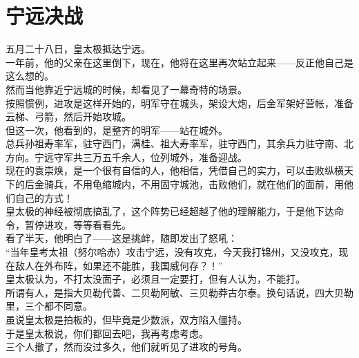 \section{宁远决战}
\ifnum{}
	\begin{multicols}{\theparacolNo}
\fi
五月二十八日，皇太极抵达宁远。\\

一年前，他的父亲在这里倒下，现在，他将在这里再次站立起来——反正他自己是这么想的。\\

然而当他靠近宁远城的时候，却看见了一幕奇特的场景。\\

按照惯例，进攻是这样开始的，明军守在城头，架设大炮，后金军架好营帐，准备云梯、弓箭，然后开始攻城。\\

但这一次，他看到的，是整齐的明军——站在城外。\\

总兵孙祖寿率军，驻守西门，满桂、祖大寿率军，驻守西门，其余兵力驻守南、北方向。宁远守军共三万五千余人，位列城外，准备迎战。\\

现在的袁崇焕，是一个很有自信的人，他相信，凭借自己的实力，可以击败纵横天下的后金骑兵，不用龟缩城内，不用固守城池，击败他们，就在他们的面前，用他们自己的方式！\\

皇太极的神经被彻底搞乱了，这个阵势已经超越了他的理解能力，于是他下达命令，暂停进攻，等等看看先。\\

看了半天，他明白了——这是挑衅，随即发出了怒吼：\\

“当年皇考太祖（努尔哈赤）攻击宁远，没有攻克，今天我打锦州，又没攻克，现在敌人在外布阵，如果还不能胜，我国威何存？！”\\

皇太极认为，不打太没面子，必须且一定要打，但有人认为，不能打。\\

所谓有人，是指大贝勒代善、二贝勒阿敏、三贝勒莽古尔泰。换句话说，四大贝勒里，三个都不同意。\\

虽说皇太极是拍板的，但毕竟是少数派，双方陷入僵持。\\

于是皇太极说，你们都回去吧，我再考虑考虑。\\

三个人撤了，然而没过多久，他们就听见了进攻的号角。\\


\end{multicols}
